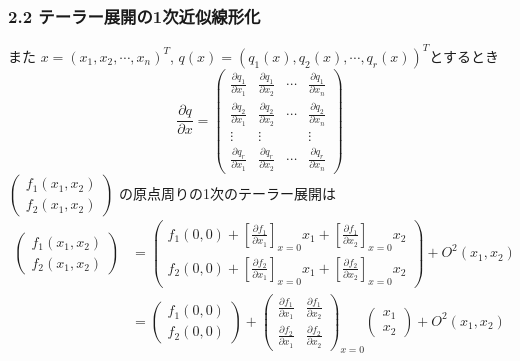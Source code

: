 \begin{frame}[t]
\frametitle{2.2 テーラー展開の1次近似線形化}
また
$x = (x_1, x_2, \cdots, x_n)^T$, $q(x) = (q_1(x), q_2(x), \cdots,
q_r(x))^T$とするとき
\begin{equation}
 \frac{\partial q}{\partial x} = 
  \left(\begin{array}{cccc}
   \frac{\partial q_1}{\partial x_1} &
    \frac{\partial q_1}{\partial x_2} &
    \cdots &
    \frac{\partial q_1}{\partial x_n} \\
	 \frac{\partial q_2}{\partial x_1} &
	  \frac{\partial q_2}{\partial x_2} &
	  \cdots &
	  \frac{\partial q_2}{\partial x_n} \\
	 \vdots & \vdots & & \vdots \\
	 \frac{\partial q_r}{\partial x_1} &
	  \frac{\partial q_r}{\partial x_2} &
	  \cdots &
	  \frac{\partial q_r}{\partial x_n}
	\end{array}\right)
\end{equation}
$
  \left(\begin{array}{c}
	f_1(x_1,x_2) \\
	f_2(x_1,x_2) 
  \end{array}\right)
$
の原点周りの1次のテーラー展開は
\begin{align*}
  \left(\begin{array}{c}
	f_1(x_1,x_2) \\
	f_2(x_1,x_2) 
  \end{array}\right)
  &=
  \left(\begin{array}{c}
	f_1(0,0) +
	\left[ \frac{\partial f_1}{\partial x_1} \right]_{x=0} x_1 
	   + \left[ \frac{\partial f_1}{\partial x_2} \right]_{x=0} x_2 \\
	f_2(0,0) +
	\left[ \frac{\partial f_2}{\partial x_1}\right]_{x=0} x_1 
		+ \left[ \frac{\partial f_2}{\partial x_2}\right]_{x=0} x_2
  \end{array}\right)
  + O^2(x_1,x_2)
  \nonumber \\
  &=
  \left(\begin{array}{c}
	f_1(0,0) \\
	f_2(0,0) 
  \end{array}\right)
  +
  \left(\begin{array}{cc}
	\frac{\partial f_1}{\partial x_1}
		& \frac{\partial f_1}{\partial x_2} \\
	\frac{\partial f_2}{\partial x_1}
		& \frac{\partial f_2}{\partial x_2}
  \end{array}\right)_{x=0}
  \left(\begin{array}{c}
	x_1 \\
	x_2 
  \end{array}\right)
  + O^2(x_1,x_2)
\end{align*}
\end{frame}

